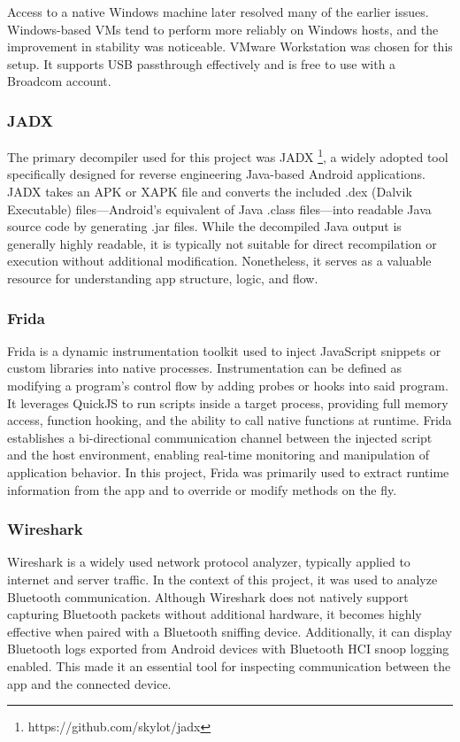 Access to a native Windows machine later resolved many of the earlier issues. Windows-based VMs tend to perform more reliably on Windows hosts, and the improvement in stability was noticeable. VMware Workstation was chosen for this setup. It supports USB passthrough effectively and is free to use with a Broadcom account.


\subsubsection{JADX}
The primary decompiler used for this project was JADX \footnote{https://github.com/skylot/jadx}, a widely adopted tool specifically designed for reverse engineering Java-based Android applications. JADX takes an APK or XAPK file and converts the included .dex (Dalvik Executable) files—Android’s equivalent of Java .class files—into readable Java source code by generating .jar files. While the decompiled Java output is generally highly readable, it is typically not suitable for direct recompilation or execution without additional modification. Nonetheless, it serves as a valuable resource for understanding app structure, logic, and flow.

\subsubsection{Frida}
Frida is a dynamic instrumentation toolkit used to inject JavaScript snippets or custom libraries into native processes. Instrumentation can be defined as modifying a program's control flow by adding probes or hooks into said program.  It leverages QuickJS to run scripts inside a target process, providing full memory access, function hooking, and the ability to call native functions at runtime. Frida establishes a bi-directional communication channel between the injected script and the host environment, enabling real-time monitoring and manipulation of application behavior. In this project, Frida was primarily used to extract runtime information from the app and to override or modify methods on the fly.

\subsubsection{Wireshark}
Wireshark is a widely used network protocol analyzer, typically applied to internet and server traffic. In the context of this project, it was used to analyze Bluetooth communication. Although Wireshark does not natively support capturing Bluetooth packets without additional hardware, it becomes highly effective when paired with a Bluetooth sniffing device. Additionally, it can display Bluetooth logs exported from Android devices with Bluetooth HCI snoop logging enabled. This made it an essential tool for inspecting communication between the app and the connected device.


